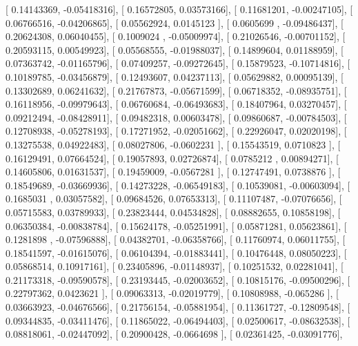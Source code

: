 \documentclass{article}
\begin{document}
       [ 0.14143369, -0.05418316],
       [ 0.16572805,  0.03573166],
       [ 0.11681201, -0.00247105],
       [ 0.06766516, -0.04206865],
       [ 0.05562924,  0.0145123 ],
       [ 0.0605699 , -0.09486437],
       [ 0.20624308,  0.06040455],
       [ 0.1009024 , -0.05009974],
       [ 0.21026546, -0.00701152],
       [ 0.20593115,  0.00549923],
       [ 0.05568555, -0.01988037],
       [ 0.14899604,  0.01188959],
       [ 0.07363742, -0.01165796],
       [ 0.07409257, -0.09272645],
       [ 0.15879523, -0.10714816],
       [ 0.10189785, -0.03456879],
       [ 0.12493607,  0.04237113],
       [ 0.05629882,  0.00095139],
       [ 0.13302689,  0.06241632],
       [ 0.21767873, -0.05671599],
       [ 0.06718352, -0.08935751],
       [ 0.16118956, -0.09979643],
       [ 0.06760684, -0.06493683],
       [ 0.18407964,  0.03270457],
       [ 0.09212494, -0.08428911],
       [ 0.09482318,  0.00603478],
       [ 0.09860687, -0.00784503],
       [ 0.12708938, -0.05278193],
       [ 0.17271952, -0.02051662],
       [ 0.22926047,  0.02020198],
       [ 0.13275538,  0.04922483],
       [ 0.08027806, -0.0602231 ],
       [ 0.15543519,  0.0710823 ],
       [ 0.16129491,  0.07664524],
       [ 0.19057893,  0.02726874],
       [ 0.0785212 ,  0.00894271],
       [ 0.14605806,  0.01631537],
       [ 0.19459009, -0.0567281 ],
       [ 0.12747491,  0.0738876 ],
       [ 0.18549689, -0.03669936],
       [ 0.14273228, -0.06549183],
       [ 0.10539081, -0.00603094],
       [ 0.1685031 ,  0.03057582],
       [ 0.09684526,  0.07653313],
       [ 0.11107487, -0.07076656],
       [ 0.05715583,  0.03789933],
       [ 0.23823444,  0.04534828],
       [ 0.08882655,  0.10858198],
       [ 0.06350384, -0.00838784],
       [ 0.15624178, -0.05251991],
       [ 0.05871281,  0.05623861],
       [ 0.1281898 , -0.07596888],
       [ 0.04382701, -0.06358766],
       [ 0.11760974,  0.06011755],
       [ 0.18541597, -0.01615076],
       [ 0.06104394, -0.01883441],
       [ 0.10476448,  0.08050223],
       [ 0.05868514,  0.10917161],
       [ 0.23405896, -0.01148937],
       [ 0.10251532,  0.02281041],
       [ 0.21173318, -0.09590578],
       [ 0.23193445, -0.02003652],
       [ 0.10815176, -0.09500296],
       [ 0.22797362,  0.0423621 ],
       [ 0.09063313, -0.02019779],
       [ 0.10808988, -0.065286  ],
       [ 0.03663923, -0.04676566],
       [ 0.21756154, -0.05881954],
       [ 0.11361727, -0.12809548],
       [ 0.09344835, -0.03411476],
       [ 0.11865022, -0.06494403],
       [ 0.02500617, -0.08632538],
       [ 0.08818061, -0.02447092],
       [ 0.20900428, -0.0664698 ],
       [ 0.02361425, -0.03091776],
\end{document}
